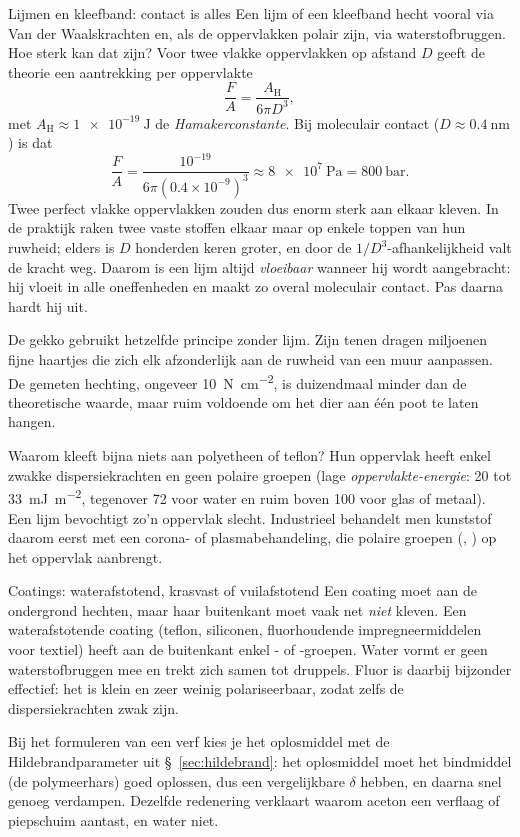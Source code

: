 \begin{toepassing}{Lijmen en kleefband: contact is alles}
Een lijm of een kleefband hecht vooral via Van der Waalskrachten en, als de oppervlakken polair zijn, via waterstofbruggen. Hoe sterk kan dat zijn? Voor twee vlakke oppervlakken op afstand $D$ geeft de theorie een aantrekking per oppervlakte
\begin{equation}
\frac{F}{A} = \frac{A_\mathrm{H}}{6\pi D^3},
\label{eq:hamaker}
\end{equation}
met $A_\mathrm{H} \approx \SI{1e-19}{\joule}$ de \emph{Hamakerconstante}. Bij moleculair contact ($D \approx \SI{0.4}{\nano\metre}$) is dat
\[
\frac{F}{A} = \frac{10^{-19}}{6\pi(0.4\times10^{-9})^3} \approx \SI{8e7}{\pascal} = \SI{800}{\bar}.
\]
Twee perfect vlakke oppervlakken zouden dus enorm sterk aan elkaar kleven. In de praktijk raken twee vaste stoffen elkaar maar op enkele toppen van hun ruwheid; elders is $D$ honderden keren groter, en door de $1/D^3$-afhankelijkheid valt de kracht weg. Daarom is een lijm altijd \emph{vloeibaar} wanneer hij wordt aangebracht: hij vloeit in alle oneffenheden en maakt zo overal moleculair contact. Pas daarna hardt hij uit.

De gekko gebruikt hetzelfde principe zonder lijm. Zijn tenen dragen miljoenen fijne haartjes die zich elk afzonderlijk aan de ruwheid van een muur aanpassen. De gemeten hechting, ongeveer \SI{10}{\newton\per\square\centi\metre}, is duizendmaal minder dan de theoretische waarde, maar ruim voldoende om het dier aan \'e\'en poot te laten hangen.

Waarom kleeft bijna niets aan polyetheen of teflon? Hun oppervlak heeft enkel zwakke dispersiekrachten en geen polaire groepen (lage \emph{oppervlakte-energie}: \SI{20}{} tot \SI{33}{\milli\joule\per\square\metre}, tegenover \SI{72}{} voor water en ruim boven \SI{100}{} voor glas of metaal). Een lijm bevochtigt zo'n oppervlak slecht. Industrieel behandelt men kunststof daarom eerst met een corona- of plasmabehandeling, die polaire groepen (, ) op het oppervlak aanbrengt.
\end{toepassing}

\begin{toepassing}{Coatings: waterafstotend, krasvast of vuilafstotend}
Een coating moet aan de ondergrond hechten, maar haar buitenkant moet vaak net \emph{niet} kleven. Een waterafstotende coating (teflon, siliconen, fluorhoudende impregneermiddelen voor textiel) heeft aan de buitenkant enkel - of -groepen. Water vormt er geen waterstofbruggen mee en trekt zich samen tot druppels. Fluor is daarbij bijzonder effectief: het is klein en zeer weinig polariseerbaar, zodat zelfs de dispersiekrachten zwak zijn.

Bij het formuleren van een verf kies je het oplosmiddel met de Hildebrandparameter uit \S~\ref{sec:hildebrand}: het oplosmiddel moet het bindmiddel (de polymeerhars) goed oplossen, dus een vergelijkbare $\delta$ hebben, en daarna snel genoeg verdampen. Dezelfde redenering verklaart waarom aceton een verflaag of piepschuim aantast, en water niet.
\end{toepassing}

